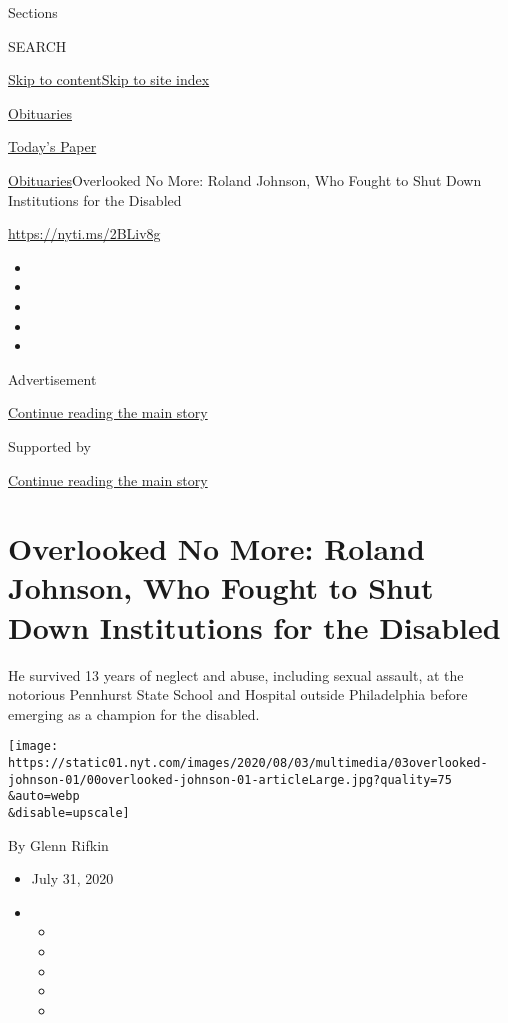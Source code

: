Sections

SEARCH

\protect\hyperlink{site-content}{Skip to
content}\protect\hyperlink{site-index}{Skip to site index}

\href{https://www.nytimes.com/section/obituaries}{Obituaries}

\href{https://myaccount.nytimes.com/auth/login?response_type=cookie\&client_id=vi}{}

\href{https://www.nytimes.com/section/todayspaper}{Today's Paper}

\href{/section/obituaries}{Obituaries}\textbar{}Overlooked No More:
Roland Johnson, Who Fought to Shut Down Institutions for the Disabled

\url{https://nyti.ms/2BLiv8g}

\begin{itemize}
\item
\item
\item
\item
\item
\end{itemize}

Advertisement

\protect\hyperlink{after-top}{Continue reading the main story}

Supported by

\protect\hyperlink{after-sponsor}{Continue reading the main story}

\hypertarget{overlooked-no-more-roland-johnson-who-fought-to-shut-down-institutions-for-the-disabled}{%
\section{Overlooked No More: Roland Johnson, Who Fought to Shut Down
Institutions for the
Disabled}\label{overlooked-no-more-roland-johnson-who-fought-to-shut-down-institutions-for-the-disabled}}

He survived 13 years of neglect and abuse, including sexual assault, at
the notorious Pennhurst State School and Hospital outside Philadelphia
before emerging as a champion for the disabled.

\texttt{[image: https://static01.nyt.com/images/2020/08/03/multimedia/03overlooked-johnson-01/00overlooked-johnson-01-articleLarge.jpg?quality=75\\\&auto=webp\\\&disable=upscale]}

By Glenn Rifkin

\begin{itemize}
\item
  July 31, 2020
\item
  \begin{itemize}
  \item
  \item
  \item
  \item
  \item
  \end{itemize}
\end{itemize}

